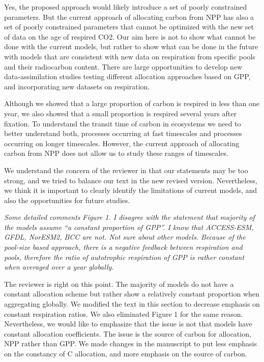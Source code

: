 Yes, the proposed approach would likely introduce a set of poorly
constrained parameters. But the current approach of allocating carbon
from NPP has also a set of poorly constrained parameters that cannot be
optimized with the new set of data on the age of respired CO2. Our aim
here is not to show what cannot be done with the current models, but
rather to show what can be done in the future with models that are
consistent with new data on respiration from specific pools and their
radiocarbon content. There are large opportunities to develop new
data-assimilation studies testing different allocation approaches based
on GPP, and incorporating new datasets on respiration.

Although we showed that a large proportion of carbon is respired in less
than one year, we also showed that a small proportion is respired
several years after fixation. To understand the transit time of carbon
in ecosystems we need to better understand both, processes occurring at
fast timescales and processes occurring on longer timescales. However,
the current approach of allocating carbon from NPP does not allow us to
study these ranges of timescales.

We understand the concern of the reviewer in that our statements may be
too strong, and we tried to balance our text in the new revised version.
Nevertheless, we think it is important to clearly identify the
limitations of current models, and also the opportunities for future
studies.

\emph{Some detailed comments} \emph{Figure 1. I disagree with the
statement that majority of the models assume ``a constant proportion of
GPP''. I know that ACCESS-ESM, GFDL, NorESM2, BCC are not. Not sure
about other models. Because of the pool-size based approach, there is a
negative feedback between respiration and pools, therefore the ratio of
autotrophic respiration of GPP is rather constant when averaged over a
year globally.}

The reviewer is right on this point. The majority of models do not have
a constant allocation scheme but rather show a relatively constant
proportion when aggregating globally. We modified the text in this
section to decrease emphasis on constant respiration ratios. We also
eliminated Figure 1 for the same reason.\\
Nevertheless, we would like to emphasize that the issue is not that
models have constant allocation coefficients. The issue is the source of
carbon for allocation, NPP rather than GPP. We made changes in the
manuscript to put less emphasis on the constancy of C allocation, and
more emphasis on the source of carbon.

